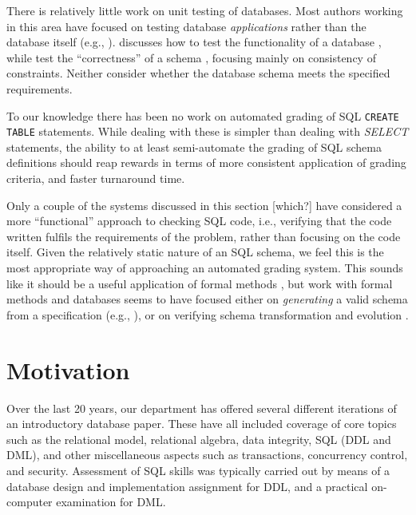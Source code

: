 \documentclass[sigconf, authordraft, capitalise]{acmart}
\begin{document}
There is relatively little work on unit testing of databases. Most authors working in this area have focused on testing database \emph{applications} rather than the database itself (e.g., \cite{Binnig.C-2008a-Multi-RQP,Chays.D-2008a-Query-based,Marcozzi.M-2012a-Test,Haller.K-2010a-Test}). \citeauthor{Ambler.S-2006a-Database} discusses how to test the functionality of a database \cite{Ambler.S-2006a-Database}, while \citeauthor{Farre.C-2008a-SVTe} test the ``correctness'' of a schema \cite{Farre.C-2008a-SVTe}, focusing mainly on consistency of constraints. Neither consider whether the database schema meets the specified requirements.

To our knowledge there has been no work on automated grading of SQL \texttt{CREATE TABLE} statements. While dealing with these is simpler than dealing with \emph{SELECT} statements, the ability to at least semi-automate the grading of SQL schema definitions should reap rewards in terms of more consistent application of grading criteria, and faster turnaround time.

Only a couple of the systems discussed in this section [which?] have considered a more ``functional'' approach to checking SQL code, i.e., verifying that the code written fulfils the requirements of the problem, rather than focusing on the code itself. Given the relatively static nature of an SQL schema, we feel this is the most appropriate way of approaching an automated grading system. This sounds like it should be a useful application of formal methods \cite{Spivey.J-1989a-An-introduction}, but work with formal methods and databases seems to have focused either on \emph{generating} a valid schema from a specification (e.g., \cite{Vatanawood.W-2004a-Formal,Lukovic.I-2003a-Proceedings,Choppella.V-2006a-Constructing}), or on verifying schema transformation and evolution \cite{Bench-Capon.T-1998a-Report}.


\section{Motivation}
\label{sec-motivation}

Over the last 20 years, our department has offered several different iterations of an introductory database paper. These have all included coverage of core topics such as the relational model, relational algebra, data integrity, SQL (DDL and DML), and other miscellaneous aspects such as transactions, concurrency control, and security. Assessment of SQL skills was typically carried out by means of a database design and implementation assignment for DDL, and a practical on-computer examination for DML.
\end{document}

